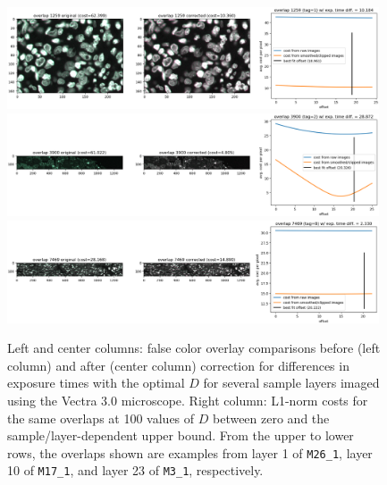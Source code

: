 \documentclass[letterpaper,11pt]{article}
\begin{document}
\begin{figure}[!ht]
\centering
\includegraphics[width=0.98\textwidth]{images/methods/cost_examples_vectra/overlay_comp_random_6761_offset=18.961}
\includegraphics[width=0.98\textwidth]{images/methods/cost_examples_vectra/overlay_comp_random_2425_offset=20.326}
\includegraphics[width=0.98\textwidth]{images/methods/cost_examples_vectra/overlay_comp_random_3946_offset=20.222}
\caption{\footnotesize Left and center columns: false color overlay comparisons before (left column) and after (center column) correction for differences in exposure times with the optimal $D$ for several sample layers imaged using the Vectra 3.0 microscope. Right column: L1-norm costs for the same overlaps at 100 values of $D$ between zero and the sample/layer-dependent upper bound. From the upper to lower rows, the overlaps shown are examples from layer 1 of \texttt{M26\_1}, layer 10 of \texttt{M17\_1}, and layer 23 of \texttt{M3\_1}, respectively.}
\label{fig:overlap_cost_examples_vectra_1}
\end{figure}
\end{document}
